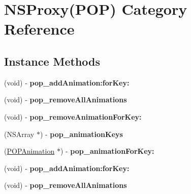 \hypertarget{category_n_s_proxy_07_p_o_p_08}{}\section{N\+S\+Proxy(P\+OP) Category Reference}
\label{category_n_s_proxy_07_p_o_p_08}
\subsection*{Instance Methods}
\begin{DoxyCompactItemize}
\item 
\mbox{\label{category_n_s_proxy_07_p_o_p_08_a7cc8d624786d6520457c1cbf448f5e6d}} 
(void) -\/ {\bfseries pop\+\_\+add\+Animation\+:for\+Key\+:}
\item 
\mbox{\label{category_n_s_proxy_07_p_o_p_08_a1a7e5ddb0dbbfbdda74d04106859be1c}} 
(void) -\/ {\bfseries pop\+\_\+remove\+All\+Animations}
\item 
\mbox{\label{category_n_s_proxy_07_p_o_p_08_a17c5ddec14053809d7b743e2643ad1fa}} 
(void) -\/ {\bfseries pop\+\_\+remove\+Animation\+For\+Key\+:}
\item 
\mbox{\label{category_n_s_proxy_07_p_o_p_08_a4da73acf7d58056df8190dc43cc9f92f}} 
(N\+S\+Array $\ast$) -\/ {\bfseries pop\+\_\+animation\+Keys}
\item 
\mbox{\label{category_n_s_proxy_07_p_o_p_08_afd16f17757f302db2f8b141e54b24f67}} 
(\mbox{\hyperlink{interface_p_o_p_animation}{P\+O\+P\+Animation}} $\ast$) -\/ {\bfseries pop\+\_\+animation\+For\+Key\+:}
\item 
\mbox{\label{category_n_s_proxy_07_p_o_p_08_a7cc8d624786d6520457c1cbf448f5e6d}} 
(void) -\/ {\bfseries pop\+\_\+add\+Animation\+:for\+Key\+:}
\item 
\mbox{\label{category_n_s_proxy_07_p_o_p_08_a1a7e5ddb0dbbfbdda74d04106859be1c}} 
(void) -\/ {\bfseries pop\+\_\+remove\+All\+Animations}
\item 
\mbox{\label{category_n_s_proxy_07_p_o_p_08_a17c5ddec14053809d7b743e2643ad1fa}} 

\end{DoxyCompactItemize}
